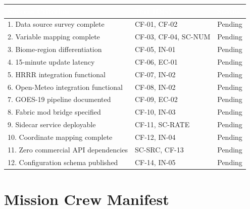 \documentclass[11pt,letterpaper]{article}
\newcommand{\tableheader}[1]{\textbf{\sffamily\textcolor{white}{#1}}}
\begin{document}
\begin{center}
\begin{tabularx}{\textwidth}{XL{3.5cm}C{1.5cm}}
\toprule
{}
\tableheader{Success Criterion} & \tableheader{Test ID(s)} & \tableheader{Status} \\
. Data source survey complete & CF-01, CF-02 & Pending \\
2. Variable mapping complete & CF-03, CF-04, SC-NUM & Pending \\
3. Biome-region differentiation & CF-05, IN-01 & Pending \\
4. 15-minute update latency & CF-06, EC-01 & Pending \\
5. HRRR integration functional & CF-07, IN-02 & Pending \\
6. Open-Meteo integration functional & CF-08, IN-02 & Pending \\
7. GOES-19 pipeline documented & CF-09, EC-02 & Pending \\
8. Fabric mod bridge specified & CF-10, IN-03 & Pending \\
9. Sidecar service deployable & CF-11, SC-RATE & Pending \\
10. Coordinate mapping complete & CF-12, IN-04 & Pending \\
11. Zero commercial API dependencies & SC-SRC, CF-13 & Pending \\
12. Configuration schema published & CF-14, IN-05 & Pending \\
\bottomrule
\end{tabularx}
\end{center}

\section{Mission Crew Manifest}
\end{document}
